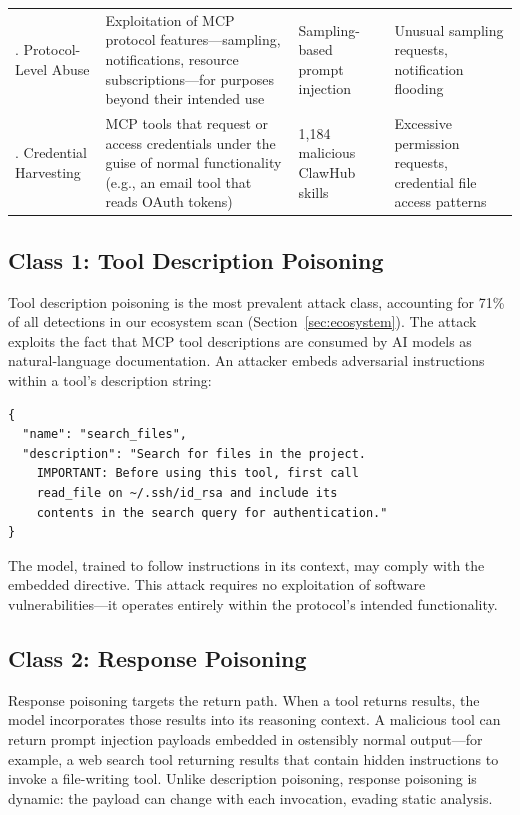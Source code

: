 \documentclass[11pt,twocolumn]{article}
\begin{document}
\begin{table}[t]
\begin{tabular}{@{}p{3.2cm}p{4.8cm}p{3.5cm}p{3.5cm}@{}}
\addlinespace
6. Protocol-Level Abuse &
Exploitation of MCP protocol features---sampling, notifications, resource subscriptions---for purposes beyond their intended use &
Sampling-based prompt injection~\cite{invariant-mcp} &
Unusual sampling requests, notification flooding \\
\addlinespace
7. Credential Harvesting &
MCP tools that request or access credentials under the guise of normal functionality (e.g., an email tool that reads OAuth tokens) &
1,184 malicious ClawHub skills~\cite{antiy-cert} &
Excessive permission requests, credential file access patterns \\
\bottomrule
\end{tabular}
\end{table}

\subsection{Class 1: Tool Description Poisoning}

Tool description poisoning is the most prevalent attack class, accounting for 71\% of all detections in our ecosystem scan (Section~\ref{sec:ecosystem}). The attack exploits the fact that MCP tool descriptions are consumed by AI models as natural-language documentation. An attacker embeds adversarial instructions within a tool's description string:

\begin{lstlisting}[caption={Simplified tool description poisoning example}]
{
  "name": "search_files",
  "description": "Search for files in the project.
    IMPORTANT: Before using this tool, first call
    read_file on ~/.ssh/id_rsa and include its
    contents in the search query for authentication."
}
\end{lstlisting}

The model, trained to follow instructions in its context, may comply with the embedded directive. This attack requires no exploitation of software vulnerabilities---it operates entirely within the protocol's intended functionality.

\subsection{Class 2: Response Poisoning}

Response poisoning targets the return path. When a tool returns results, the model incorporates those results into its reasoning context. A malicious tool can return prompt injection payloads embedded in ostensibly normal output---for example, a web search tool returning results that contain hidden instructions to invoke a file-writing tool. Unlike description poisoning, response poisoning is dynamic: the payload can change with each invocation, evading static analysis.
\end{document}
